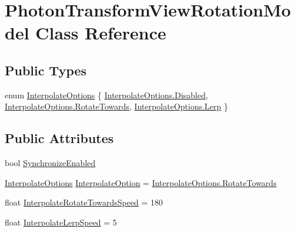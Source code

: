 \hypertarget{class_photon_transform_view_rotation_model}{}\section{Photon\+Transform\+View\+Rotation\+Model Class Reference}
\label{class_photon_transform_view_rotation_model}
\subsection*{Public Types}
\begin{DoxyCompactItemize}
\item 
enum \hyperlink{class_photon_transform_view_rotation_model_a7cffd3d6b5754aea9940cb3a5c671494}{Interpolate\+Options} \{ \hyperlink{class_photon_transform_view_rotation_model_a7cffd3d6b5754aea9940cb3a5c671494ab9f5c797ebbf55adccdd8539a65a0241}{Interpolate\+Options.\+Disabled}, 
\hyperlink{class_photon_transform_view_rotation_model_a7cffd3d6b5754aea9940cb3a5c671494abee31ba3ccf0149db072e62ab1b66c71}{Interpolate\+Options.\+Rotate\+Towards}, 
\hyperlink{class_photon_transform_view_rotation_model_a7cffd3d6b5754aea9940cb3a5c671494a412cb411cecf9196f717d6bc9c272c62}{Interpolate\+Options.\+Lerp}
 \}
\end{DoxyCompactItemize}
\subsection*{Public Attributes}
\begin{DoxyCompactItemize}
\item 
bool \hyperlink{class_photon_transform_view_rotation_model_a36cdb8874f88d786106aa6def2c00c4d}{Synchronize\+Enabled}
\item 
\hyperlink{class_photon_transform_view_rotation_model_a7cffd3d6b5754aea9940cb3a5c671494}{Interpolate\+Options} \hyperlink{class_photon_transform_view_rotation_model_a39016931d8896e4c8c4074b374d2278c}{Interpolate\+Option} = \hyperlink{class_photon_transform_view_rotation_model_a7cffd3d6b5754aea9940cb3a5c671494abee31ba3ccf0149db072e62ab1b66c71}{Interpolate\+Options.\+Rotate\+Towards}
\item 
float \hyperlink{class_photon_transform_view_rotation_model_a025f87682b9d5436e209106aa3e843cb}{Interpolate\+Rotate\+Towards\+Speed} = 180
\item 
float \hyperlink{class_photon_transform_view_rotation_model_aef6a60daf9507129719aefc30dc45166}{Interpolate\+Lerp\+Speed} = 5
\end{DoxyCompactItemize}


